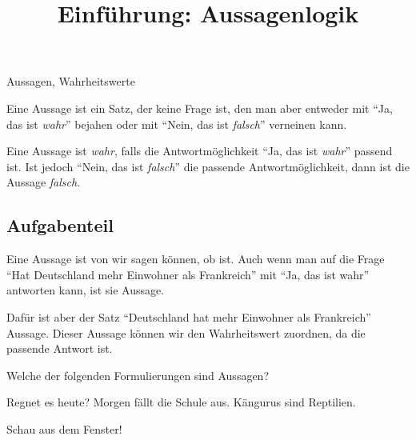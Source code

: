 \documentclass{uebungsblatt}
\title{Einführung: Aussagenlogik}
\begin{document}
\maketitle
\begin{contents}
    Aussagen, Wahrheitswerte
\end{contents}


\begin{definition}
    Eine Aussage ist ein Satz, der keine Frage ist, den man aber entweder mit 
    \enquote{Ja, das ist \emph{wahr}} bejahen oder mit \enquote{Nein, das ist \emph{falsch}} 
    verneinen kann.
\end{definition}



\begin{definition}
    Eine Aussage ist \emph{wahr}, falls die Antwortmöglichkeit \enquote{Ja, das ist \emph{wahr}}
    passend ist. Ist jedoch \enquote{Nein, das ist \emph{falsch}} die passende
    Antwortmöglichkeit, dann ist die Aussage \emph{falsch}.
\end{definition}

\subsection*{Aufgabenteil}

\begin{exercise}
    Eine Aussage ist  von  wir sagen können, ob    
    ist. Auch wenn man auf die Frage \enquote{Hat Deutschland mehr Einwohner als Frankreich} mit \enquote{Ja, das ist wahr} antworten kann, ist sie  Aussage. 
    
    Dafür ist aber der Satz \enquote{Deutschland hat mehr Einwohner als Frankreich}  Aussage. Dieser Aussage können wir den Wahrheitswert  zuordnen, da  die passende Antwort ist.
\end{exercise}

\begin{exercise}
    Welche der folgenden Formulierungen sind Aussagen?

    \begin{multicols}{2}
        \begin{multiplechoice}
            \item Regnet es heute?
            \citem Morgen fällt die Schule aus.
            \citem Kängurus sind Reptilien.
            \item Schau aus dem Fenster!
        \end{multiplechoice}
    \end{multicols}

\end{exercise}
\end{document}
